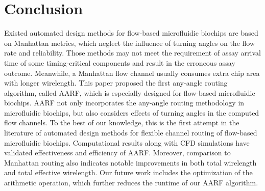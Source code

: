 \documentclass[journal]{IEEEtran}
\begin{document}
\section{Conclusion}
\label{sec:cln}

Existed automated design methods for flow-based microfluidic biochips are based on Manhattan metrics, which neglect the influence of turning angles on the flow rate and reliability. 
Those methods may not meet the requirement of assay arrival time of some timing-critical components and result in the erroneous assay outcome. 
Meanwhile, a Manhattan flow channel usually consumes extra chip area with longer wirelength. 
This paper proposed the first any-angle routing algorithm, called AARF, which is especially designed for flow-based microfluidic biochips. AARF not only incorporates the any-angle routing methodology in microfluidic biochips, but also considers effects of turning angles in the computed flow channels. To the best of our knowledge, this is the first attempt in the literature of automated design methods for flexible channel routing of flow-based microfluidic biochips.
Computational results along with CFD simulations have validated effectiveness and efficiency of AARF. 
Moreover, comparison to Manhattan routing also indicates notable improvements in both total wirelength and total effective wirelength. Our future work includes the optimization of the arithmetic operation, which further reduces the runtime of our AARF algorithm.
\end{document}

